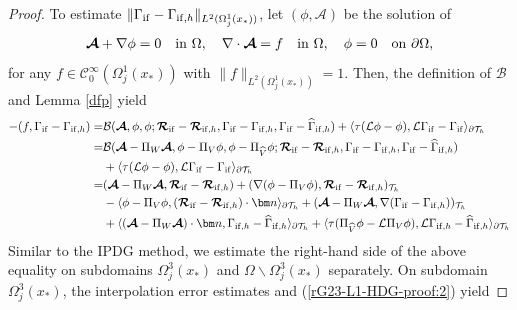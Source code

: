 \documentclass[1996/10/24]{amsart}
\theoremstyle{definition}
\numberwithin{equation}{section}
\begin{document}
\begin{proof}
To estimate $\|\Gamma_{{\rm if}}-\Gamma_{{\rm if},h}\|_{L^2(\Omega_j^1(x_{\ast}))}$, let $(\phi,\boldsymbol{\mathcal{A}})$ be the solution of
\begin{align*}
\boldsymbol{\mathcal{A}}+\nabla \phi=0\quad {\rm in}~\Omega,\quad \nabla\cdot\boldsymbol{\mathcal{A}}=f\quad {\rm in}~\Omega,\quad \phi=0\quad {\rm on}~\partial\Omega,
\end{align*}
for any $f\in \mathcal{C}_0^{\infty}(\Omega_j^1(x_{\ast}))$ with $\|f\|_{L^2(\Omega_j^1(x_{\ast}))}=1$. Then, the definition of $\mathcal{B}$ and Lemma \ref{dfp} yield
\begin{align*}
-(f,\Gamma_{{\rm if}}-\Gamma_{{\rm if},h})=&\mathcal{B}(\boldsymbol{\mathcal{A}},\phi,\phi;\boldsymbol{\mathcal{R}}_{{\rm if}}-\boldsymbol{\mathcal{R}}_{{\rm if},h},\Gamma_{{\rm if}}-\Gamma_{{\rm if},h},\Gamma_{{\rm if}}-\widehat{\Gamma}_{{\rm if},h})+\langle\tau(\mathcal{L}\phi-\phi),\mathcal{L}\Gamma_{{\rm if}}-\Gamma_{{\rm if}}\rangle_{\partial\mathcal{T}_h}\\
=&\mathcal{B}(\boldsymbol{\mathcal{A}}-\Pi_W\boldsymbol{\mathcal{A}},\phi-\Pi_V\phi,\phi-\Pi_{\widehat{V}}\phi;\boldsymbol{\mathcal{R}}_{{\rm if}}-\boldsymbol{\mathcal{R}}_{{\rm if},h},
\Gamma_{{\rm if}}-\Gamma_{{\rm if},h},\Gamma_{{\rm if}}-\widehat{\Gamma}_{{\rm if},h})\\
&+\langle\tau(\mathcal{L}\phi-\phi),\mathcal{L}\Gamma_{{\rm if}}-\Gamma_{{\rm if}}\rangle_{\partial\mathcal{T}_h}\\
=&(\boldsymbol{\mathcal{A}}-\Pi_W\boldsymbol{\mathcal{A}},\boldsymbol{\mathcal{R}}_{{\rm if}}-\boldsymbol{\mathcal{R}}_{{\rm if},h})+
(\nabla(\phi-\Pi_V\phi),\boldsymbol{\mathcal{R}}_{{\rm if}}-\boldsymbol{\mathcal{R}}_{{\rm if},h})_{\mathcal{T}_h}\\
&-\langle\phi-\Pi_V\phi,(\boldsymbol{\mathcal{R}}_{{\rm if}}-\boldsymbol{\mathcal{R}}_{{\rm if},h})\cdot{\bm n}\rangle_{\partial\mathcal{T}_h}+
(\boldsymbol{\mathcal{A}}-\Pi_W\boldsymbol{\mathcal{A}},\nabla(\Gamma_{{\rm if}}-\Gamma_{{\rm if},h}))_{\mathcal{T}_h}\\
&+\langle(\boldsymbol{\mathcal{A}}-\Pi_W\boldsymbol{\mathcal{A}})\cdot{\bm n},\Gamma_{{\rm if},h}-\widehat{\Gamma}_{{\rm if},h}\rangle_{\partial\mathcal{T}_h}
+\langle\tau(\Pi_{\widehat{V}}\phi-\mathcal{L}\Pi_V\phi),\mathcal{L}\Gamma_{{\rm if},h}-\widehat{\Gamma}_{{\rm if},h}\rangle_{\partial\mathcal{T}_h}
\end{align*}
Similar to the IPDG method, we estimate the right-hand side of the above equality on subdomains $\Omega_j^3(x_{\ast})$ and $\Omega\backslash\Omega_j^3(x_{\ast})$ separately. On subdomain $\Omega_j^3(x_{\ast})$, the interpolation error estimates and (\ref{rG23-L1-HDG-proof:2}) yield

\end{proof}
\end{document}
